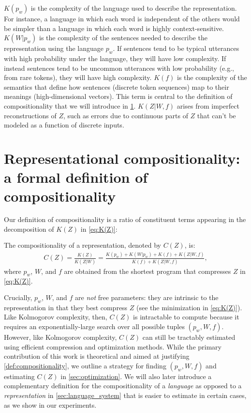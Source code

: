 \documentclass{article} %
\newcommand{\Comp}{Representational compositionality}
\begin{document}
\underline{$K(p_w)$} is the complexity of the language used to describe the representation. For instance, a language in which each word is independent of the others would be simpler than a language in which each word is highly context-sensitive. \underline{$K(W|p_w)$} is the complexity of the sentences needed to describe the representation using the language $p_w$. If sentences tend to be typical utterances with high probability under the language, they will have low complexity. If instead sentences tend to be uncommon utterances with low probability (e.g., from rare tokens), they will have high complexity. \underline{$K(f)$} is the complexity of the semantics that define how sentences (discrete token sequences) map to their meanings (high-dimensional vectors). This term is central to the definition of compositionality that we will introduce in \cref{sec:compositionality}. \underline{$K(Z|W,f)$} arises from imperfect reconstructions of $Z$, such as errors due to continuous parts of $Z$ that can’t be modeled as a function of discrete inputs.


\section{\Comp{}: a formal definition of compositionality}
\label{sec:compositionality}

Our definition of compositionality is a ratio of constituent terms appearing in the decomposition of $K(Z)$ in \cref{eq:K(Z)}: 

\begin{definition}[\Comp{}]
    \label{def:compositionality}
    The compositionality of a representation, denoted by $C(Z)$, is:
    \begin{align}
        \label{eq:C(Z)}
        C(Z) = \frac{K(Z)}{K(Z|W)} = \frac{K(p_w) + K(W|p_w) + K(f) + K(Z|W,f)}{K(f) + K(Z|W,f)} ,
    \end{align}
    where $p_w$, $W$, and $f$ are obtained from the shortest program that compresses $Z$ in \cref{eq:K(Z)}.
\end{definition}

Crucially, $p_w$, $W$, and $f$ are \emph{not} free parameters: they are intrinsic to the representation in that they best compress $Z$ (see the minimization in \cref{eq:K(Z)}). Like Kolmogorov complexity, then, $C(Z)$ is intractable to compute because it requires an exponentially-large search over all possible tuples $(p_w, W, f)$. However, like Kolmogorov complexity, $C(Z)$ can still be tractably estimated using efficient compression and optimization methods. While the primary contribution of this work is theoretical and aimed at justifying \cref{def:compositionality}, we outline a strategy for finding $(p_w, W, f)$ and estimating $C(Z)$ in \cref{sec:optimization}. We will also later introduce a complementary definition for the compositionality of a \emph{language} as opposed to a \emph{representation} in \cref{sec:language_system} that is easier to estimate in certain cases, as we show in our experiments.
\end{document}
